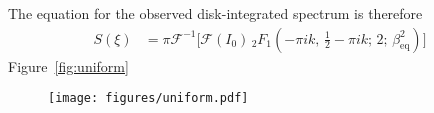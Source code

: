\documentclass[modern]{aastex62}
\begin{document}
The equation for the observed disk-integrated spectrum is therefore
%
\begin{align}
    S(\xi) &= 
    \pi
    \mathcal{F}^{-1}
    \Big[
        \mathcal{F}(I_0)
        \,
        _{2}F_{1}
        \left(
            -\pi i k, \, 
            \frac{1}{2} - \pi i k; \,
            2; \,
            \beta_\mathrm{eq}^2
        \right)
    \Big]
\end{align}
%
Figure~\ref{fig:uniform}

\begin{figure}[p!]
    \centering
    \texttt{[image: figures/uniform.pdf]}
\end{figure}


\end{document}
